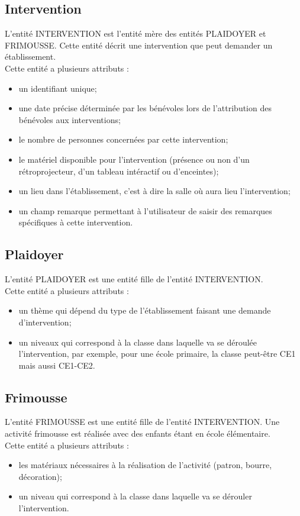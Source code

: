 \documentclass[asi, sansVersion]{picINSA}
\begin{document}
\subsection*{Intervention}
L'entité INTERVENTION est l'entité mère des entités PLAIDOYER et FRIMOUSSE. Cette entité décrit une intervention que peut demander un établissement. \\
Cette entité a plusieurs attributs :
\begin{itemize}
\item un identifiant unique;
\item une date précise déterminée par les bénévoles lors de l'attribution des bénévoles aux interventions;
\item le nombre de personnes concernées par cette intervention;
\item le matériel disponible pour l'intervention (présence ou non d'un rétroprojecteur, d'un tableau intéractif ou d'enceintes);
\item un lieu dans l'établissement, c'est à dire la salle où aura lieu l'intervention;
\item un champ remarque permettant à l'utilisateur de saisir des remarques spécifiques à cette intervention. 
\end{itemize}

\subsection*{Plaidoyer}
L'entité PLAIDOYER est une entité fille de l'entité INTERVENTION. \\
Cette entité a plusieurs attributs : 
\begin{itemize}
\item un thème qui dépend du type de l'établissement faisant une demande d'intervention;
\item un niveaux qui correspond à la classe dans laquelle va se déroulée l'intervention, par exemple, pour une école primaire, la classe peut-être CE1 mais aussi CE1-CE2.
\end{itemize}

\subsection*{Frimousse}
L'entité FRIMOUSSE est une entité fille de l'entité INTERVENTION. Une activité frimousse est réalisée avec des enfants étant en école élémentaire. \\
Cette entité a plusieurs attributs :
\begin{itemize}
\item les matériaux nécessaires à la réalisation de l'activité (patron, bourre, décoration); %
\item un niveau qui correspond à la classe dans laquelle va se dérouler l'intervention.
\end{itemize}
\end{document}

